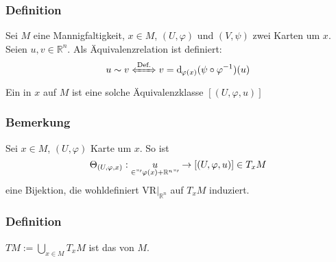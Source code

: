 \subsubsection{Definition}
\label{ssub:130}
Sei $M$ eine Mannigfaltigkeit, $x\in M$, $(U,\varphi)$ und $(V,\psi)$ zwei Karten um $x$. Seien $u,v\in \mathds{R}^n$. Als Äquivalenzrelation ist definiert:
\[
u \sim v \xLeftrightarrow{\text{Def.}} v = \mathd_{\varphi(x)}(\psi \circ \varphi^{-1})(u)
\]
Ein  in $x$ auf $M$ ist eine solche Äquivalenzklasse $[(U,\varphi,u)]$
\missingfigure{}

\subsubsection{Bemerkung}
\label{ssub:131}
Sei $x\in M$, $(U,\varphi)$ Karte um $x$. So ist
\[
\Theta_{(U,\varphi,x)}: \underset{\in "'\varphi(x) + \mathds{R}^n"'}{u} \to [(U,\varphi,u)]\in T_x M
\]
eine Bijektion, die wohldefiniert $\text{VR}\vert_{\mathds{R}^n}$ auf $T_x M$ induziert.

\subsubsection{Definition}
\label{ssub:132}
$TM := \bigcup_{x\in M} T_x M$ ist das  von $M$.

